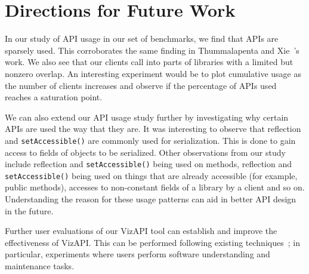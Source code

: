 \section{Directions for Future Work}
In our study of API usage in our set of benchmarks, we find that APIs are sparsely used. 
This corroborates the same finding in Thummalapenta and Xie~\cite{thummalapenta08:_spotw}'s work.
We also see that our clients call into parts of libraries with a limited but nonzero overlap. 
An interesting experiment would be to plot cumulative usage as the number of clients increases and observe if the percentage of APIs used reaches a saturation
point.

We can also extend our API usage study further by investigating why certain APIs are used the way that they are. 
It was interesting to observe that reflection and \texttt{setAccessible()} are commonly used for serialization. This is done to gain access to fields of objects to be serialized.
Other observations from our study include reflection and \texttt{setAccessible()} being used on methods, 
reflection and \texttt{setAccessible()} being used on things that are already accessible (for example, public methods), 
accesses to non-constant fields of a library by a client and so on. Understanding the reason for these usage patterns can aid in better API design in the future.

Further user evaluations of our VizAPI tool can establish and improve the
effectiveness of VizAPI. This can be performed following
existing techniques~\cite{merino18:_system_liter_review_softw_visual_evaluat}; in
particular, experiments where users perform software
understanding and maintenance tasks.
